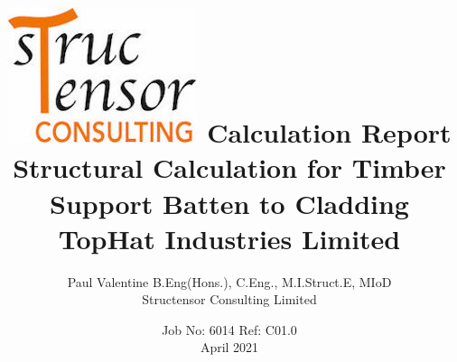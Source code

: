 \renewcommand{\baselinestretch}{1}
\usepackage{lastpage}
\usepackage{fancyhdr}
\pagestyle{fancy}
\fancyhf{}
\renewcommand{\headrulewidth}{0pt} 
\geometry{a4paper,left=25mm, top=20mm}
\author{Paul Valentine B.Eng(Hons.), C.Eng., M.I.Struct.E, MIoD \\ Structensor Consulting Limited}
\title{\includegraphics[scale=0.50]{../images/structensor_logo}\bigbreak
\textbf{Calculation Report}\\ \bigbreak 
Structural Calculation for Timber Support Batten to Cladding\\
TopHat Industries Limited\\
\bigbreak}
\date{Job No: 6014 Ref: C01.0\\April 2021}
